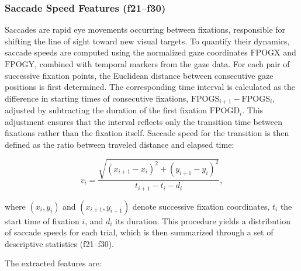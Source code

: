 \documentclass{article}
\begin{document}
\subsubsection{Saccade Speed Features (f21–f30)}

Saccades are rapid eye movements occurring between fixations, responsible for shifting the line of sight toward new visual targets. 
To quantify their dynamics, saccade speeds are computed using the normalized gaze coordinates \(\mathrm{FPOGX}\) and \(\mathrm{FPOGY}\), combined with temporal markers from the gaze data. 
For each pair of successive fixation points, the Euclidean distance between consecutive gaze positions is first determined. 
The corresponding time interval is calculated as the difference in starting times of consecutive fixations, \(\mathrm{FPOGS}_{i+1} - \mathrm{FPOGS}_i\), adjusted by subtracting the duration of the first fixation \(\mathrm{FPOGD}_i\). 
This adjustment ensures that the interval reflects only the transition time between fixations rather than the fixation itself. 
Saccade speed for the transition is then defined as the ratio between traveled distance and elapsed time:

\[
v_i = \frac{\sqrt{(x_{i+1} - x_i)^2 + (y_{i+1} - y_i)^2}}{t_{i+1} - t_i - d_i},
\]

where \((x_i, y_i)\) and \((x_{i+1}, y_{i+1})\) denote successive fixation coordinates, \(t_i\) the start time of fixation \(i\), and \(d_i\) its duration. 
This procedure yields a distribution of saccade speeds for each trial, which is then summarized through a set of descriptive statistics (f21–f30).

\noindent The extracted features are:
\end{document}
